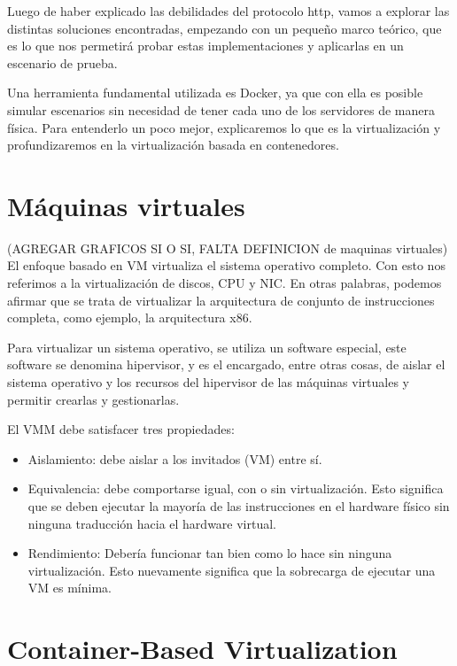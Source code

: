
Luego de haber explicado las debilidades del protocolo http, vamos a explorar las 
distintas soluciones encontradas, empezando con un pequeño marco teórico, que es lo que 
nos permetirá probar estas implementaciones y aplicarlas en un escenario de prueba.

Una herramienta fundamental utilizada es Docker, ya que con ella es posible simular 
escenarios sin necesidad de tener cada uno de los servidores de manera física. Para
entenderlo un poco mejor, explicaremos lo que es la virtualización y profundizaremos 
en la virtualización basada en contenedores.
    
\section{Máquinas virtuales}

(AGREGAR GRAFICOS SI O SI, FALTA DEFINICION de maquinas virtuales)
El enfoque basado en VM virtualiza el sistema operativo completo. Con esto nos referimos 
a la virtualización de discos, CPU y NIC. En otras palabras, podemos afirmar que se 
trata de virtualizar la arquitectura de conjunto de instrucciones completa, como ejemplo, 
la arquitectura x86. 

Para virtualizar un sistema operativo, se utiliza un software especial, este software 
se denomina hipervisor, y es el encargado, entre otras cosas, de aislar el sistema 
operativo y los recursos del hipervisor de las máquinas virtuales y permitir crearlas 
y gestionarlas.

El VMM debe satisfacer tres propiedades:
\begin{itemize}
    \item Aislamiento: debe aislar a los invitados (VM) entre sí. 
    \item Equivalencia: debe comportarse igual, con o sin virtualización. Esto 
    significa que se deben ejecutar la mayoría de las instrucciones en el hardware 
    físico sin ninguna traducción hacia el hardware virtual.
    \item Rendimiento: Debería funcionar tan bien como lo hace sin ninguna 
    virtualización. Esto nuevamente significa que la sobrecarga de ejecutar 
    una VM es mínima.
\end{itemize}

\section{Container-Based  Virtualization}

